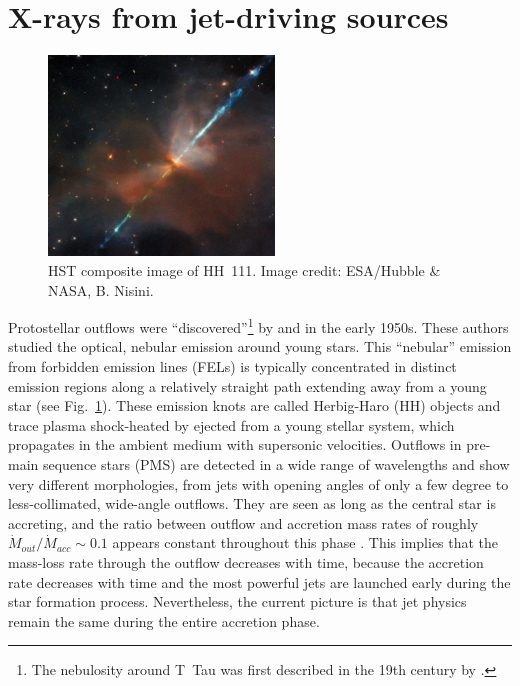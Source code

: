 \section{X-rays from jet-driving sources}

\begin{figure}[t]
 \centering
\includegraphics[width=6cm]{figs/HH111_-_HST_-_Potw2135a.jpg}
\caption{HST composite image of HH~111. Image credit: ESA/Hubble \& NASA, B. Nisini. \label{fig:HH111} }
\end{figure}

Protostellar outflows  were ``discovered''\footnote{The nebulosity around T~Tau was first described in the 19th century  by \citet{Burnham_1890, Burnham_1894}.} by \citet{Herbig_1950,Herbig_1951} and \citet{Haro_1952,Haro_1953} in the early 1950s. These authors studied the optical, nebular emission around young stars. This ``nebular'' emission from forbidden emission lines (FELs) is typically concentrated in distinct emission regions along a relatively straight path extending away from a young star (see Fig.~\ref{fig:HH111}). These emission knots are called Herbig-Haro (HH) objects and trace plasma shock-heated by ejected from a young stellar system, which propagates in the ambient medium with supersonic velocities. Outflows in pre-main sequence stars (PMS) are detected in a wide range of wavelengths and show very different morphologies, from jets with opening angles of only a few degree to less-collimated, wide-angle outflows. 
They are seen as long as the central star is accreting, and the ratio between outflow and accretion mass rates of roughly $\dot{M}_{out}/\dot{M}_{acc}\sim0.1$ appears constant throughout this phase \citep[e.g.,][]{Cabrit_2007, Nisini_2018}. This implies that the mass-loss rate through the outflow decreases with time, because the accretion rate decreases with time and the most powerful jets are launched early during the star formation process. Nevertheless, the current picture is that jet physics remain the same during the entire accretion phase.

